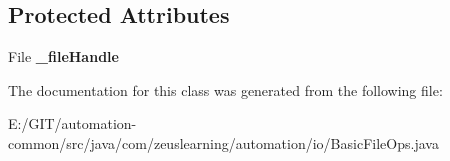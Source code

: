 \subsection*{Protected Attributes}
\begin{DoxyCompactItemize}
\item 
\hypertarget{classcom_1_1zeuslearning_1_1automation_1_1io_1_1BasicFileOps_a5fafd97477456af2dc3e3f3a1b19a642}{}\label{classcom_1_1zeuslearning_1_1automation_1_1io_1_1BasicFileOps_a5fafd97477456af2dc3e3f3a1b19a642} 
File {\bfseries \+\_\+file\+Handle}
\end{DoxyCompactItemize}


The documentation for this class was generated from the following file\+:\begin{DoxyCompactItemize}
\item 
E\+:/\+G\+I\+T/automation-\/common/src/java/com/zeuslearning/automation/io/Basic\+File\+Ops.\+java\end{DoxyCompactItemize}
